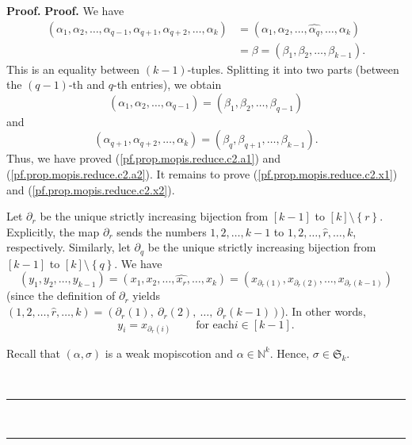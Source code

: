 \documentclass[numbers=enddot,12pt,final,onecolumn,notitlepage]{scrartcl}%
\theoremstyle{definition}
\newenvironment{fineprint}{\begin{small}}{\end{small}}
\newenvironment{proof}[1][Proof]{\noindent\textbf{#1.} }{\ \rule{0.5em}{0.5em}}
\begin{document}
\begin{fineprint}
\begin{proof}
\begin{proof}
We have
\begin{align*}
\left(  \alpha_{1},\alpha_{2},\ldots,\alpha_{q-1},\alpha_{q+1},\alpha
_{q+2},\ldots,\alpha_{k}\right)   &  =\left(  \alpha_{1},\alpha_{2}%
,\ldots,\widehat{\alpha_{q}},\ldots,\alpha_{k}\right) \\
&  =\beta=\left(  \beta_{1},\beta_{2},\ldots,\beta_{k-1}\right)  .
\end{align*}
This is an equality between $\left(  k-1\right)  $-tuples. Splitting it into
two parts (between the $\left(  q-1\right)  $-th and $q$-th entries), we
obtain%
\[
\left(  \alpha_{1},\alpha_{2},\ldots,\alpha_{q-1}\right)  =\left(  \beta
_{1},\beta_{2},\ldots,\beta_{q-1}\right)
\]
and%
\[
\left(  \alpha_{q+1},\alpha_{q+2},\ldots,\alpha_{k}\right)  =\left(  \beta
_{q},\beta_{q+1},\ldots,\beta_{k-1}\right)  .
\]
Thus, we have proved (\ref{pf.prop.mopis.reduce.c2.a1}) and
(\ref{pf.prop.mopis.reduce.c2.a2}). It remains to prove
(\ref{pf.prop.mopis.reduce.c2.x1}) and (\ref{pf.prop.mopis.reduce.c2.x2}).

Let $\partial_{r}$ be the unique strictly increasing bijection from $\left[
k-1\right]  $ to $\left[  k\right]  \setminus\left\{  r\right\}  $.
Explicitly, the map $\partial_{r}$ sends the numbers $1,2,\ldots,k-1$ to
$1,2,\ldots,\widehat{r},\ldots,k$, respectively. Similarly, let $\partial_{q}$
be the unique strictly increasing bijection from $\left[  k-1\right]  $ to
$\left[  k\right]  \setminus\left\{  q\right\}  $. We have%
\[
\left(  y_{1},y_{2},\ldots,y_{k-1}\right)  =\left(  x_{1},x_{2},\ldots
,\widehat{x_{r}},\ldots,x_{k}\right)  =\left(  x_{\partial_{r}\left(
1\right)  },x_{\partial_{r}\left(  2\right)  },\ldots,x_{\partial_{r}\left(
k-1\right)  }\right)
\]
(since the definition of $\partial_{r}$ yields $\left(  1,2,\ldots
,\widehat{r},\ldots,k\right)  =\left(  \partial_{r}\left(  1\right)
,\ \partial_{r}\left(  2\right)  ,\ \ldots,\ \partial_{r}\left(  k-1\right)
\right)  $). In other words,%
\begin{equation}
y_{i}=x_{\partial_{r}\left(  i\right)  }\ \ \ \ \ \ \ \ \ \ \text{for each
}i\in\left[  k-1\right]  . \label{pf.prop.mopis.reduce.c2.pf.yi=}%
\end{equation}


Recall that $\left(  \alpha,\sigma\right)  $ is a weak mopiscotion and
$\alpha\in\mathbb{N}^{k}$. Hence, $\sigma\in\mathfrak{S}_{k}$.


\end{proof}
\end{proof}
\end{fineprint}
\end{document}
